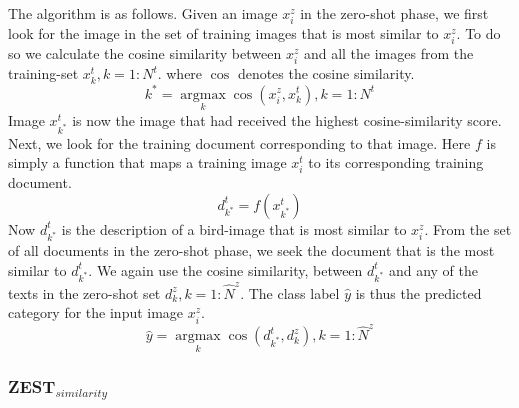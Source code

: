 \documentclass[11pt,a4paper]{article}
\newcommand\gal[1]{\textcolor{bright}{\textbf{GAL:} #1 }}
\begin{document}
The algorithm is as follows. Given an image $x^z_i$ in the zero-shot phase,
we first look for the image in the set of training images that is most similar to $x^z_i$. To do so we calculate the cosine similarity between $x^z_i$  and all the images from the training-set $x^{t}_k, k=1:N^{t}$.
where $\cos$ denotes the cosine similarity.
\begin{equation}
{k}^*= \operatorname*{argmax}_{k}\cos(x_i^{z},x^{t}_k), k = 1:N^{t}
\end{equation}
Image $x_{k^*}^{t}$ is now the image that had received the highest cosine-similarity score. Next, we look for the training  document corresponding to that image. Here $f$ is simply a function that maps  a training image $x_i^{t}$ to its corresponding training document.
\begin{equation}
d^{t}_{k^*}=f(x^{t}_{k^*}) 
\end{equation}
Now \(d^{t}_{k^*}\) is the description of a bird-image that is most similar to \(x_i^{z}\). From the set of all documents in the zero-shot phase, we seek the document that is the most similar to $d_{k^*}^{t}$.
We again use
 the cosine similarity, between $d_{k^*}^{t}$ and any of  the texts in the zero-shot set $d^{z}_k, k = 1 : \hat{N}^{z}$.
 The class label  $\hat{y}$ is thus the predicted category for the input image $x^{z}_i$.
\begin{equation}
\hat{y}= \operatorname*{argmax}_{k}\cos(d^{t}_{k^*},d^{z}_{k}), k = 1 : \hat{N}^{z}
\end{equation}



%
%




\subsubsection{ZEST$_{similarity}$}
\end{document}
